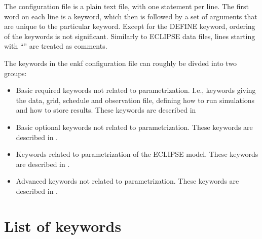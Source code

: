 \documentclass[a4paper,10pt,english]{sphinxmanual}
\begin{document}
The configuration file is a plain text file, with one statement per line. The
first word on each line is a keyword, which then is followed by a set of
arguments that are unique to the particular keyword. Except for the DEFINE
keyword, ordering of the keywords is not significant. Similarly to ECLIPSE data
files, lines starting with “\textendash{}” are treated as comments.

The keywords in the enkf configuration file can roughly be divded into two
groups:
\begin{itemize}
\item {} 
Basic required keywords not related to parametrization. I.e., keywords giving
the data, grid, schedule and observation file, defining how to run simulations
and how to store results. These keywords are described in {\hyperref[\detokenize{keywords/index:id1}]{}}

\item {} 
Basic optional keywords not related to parametrization. These keywords are
described in {\hyperref[\detokenize{keywords/index:id2}]{}}.

\item {} 
Keywords related to parametrization of the ECLIPSE model. These keywords are
described in {\hyperref[\detokenize{keywords/index:id4}]{}}.

\item {} 
Advanced keywords not related to parametrization. These keywords are described
in {\hyperref[\detokenize{keywords/index:id11}]{}}.

\end{itemize}


\section{List of keywords}
\label{\detokenize{keywords/index:list-of-keywords}}
\end{document}
